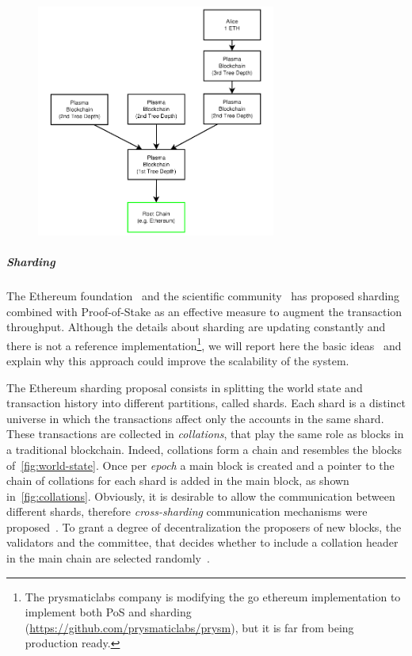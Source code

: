 \begin{figure}[!h]
  \begin{center}
    \includegraphics[width=0.7\textwidth]{./res/img/plasma}
    \label{fig:plasma}
  \end{center}
\end{figure}

\subparagraph{Sharding}
The Ethereum foundation~\cite{bib:mauve, bib:sharding-faq} and the scientific
community~\cite{bib:scaling-croman} has proposed sharding combined with
Proof-of-Stake as an effective measure to augment the transaction throughput.
Although the details about sharding are updating constantly and there is not a
reference implementation\footnote{The prysmaticlabs company is modifying the go
ethereum implementation to implement both PoS and sharding
(\url{https://github.com/prysmaticlabs/prysm}), but it is far from being
production ready.}, we will report here the basic
ideas~\cite{bib:mauve,bib:sharding-faq} and explain why this approach could
improve the scalability of the system.

The Ethereum sharding proposal consists in splitting the world state and
transaction history into different partitions, called shards.
Each shard is a distinct universe in which the transactions affect only the
accounts in the same shard. These transactions are collected in
\emph{collations}, that play the same role as blocks in a traditional
blockchain. Indeed, collations form a chain and resembles the blocks
of~\autoref{fig:world-state}. Once per \emph{epoch} a main block is created
and a pointer to the chain of collations for each shard is added in the main
block, as shown in~\autoref{fig:collations}.
Obviously, it is desirable to allow the communication between different shards,
therefore \emph{cross-sharding} communication mechanisms were
proposed~\cite{bib:sharding-faq}. To grant a degree of decentralization the
proposers of new blocks, the validators and the committee, that decides whether
to include a collation header in the main chain are selected randomly~\cite{}.

